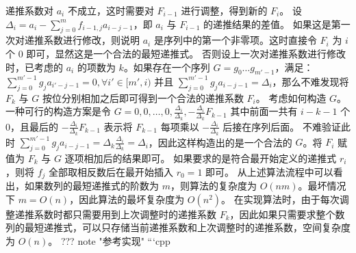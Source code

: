 递推系数对 $a_i$ 不成立，这时需要对 $F_{i - 1}$ 进行调整，得到新的 $F_i$。\markdownRendererOlItemEnd 
\markdownRendererOlEndTight \markdownRendererInterblockSeparator
{}设 $\Delta_i = a_i - \sum_{j = 0} ^ m f_{i - 1, j} a_{i - j - 1}$，即 $a_i$ 与 $F_{i - 1}$ 的递推结果的差值。\markdownRendererParagraphSeparator
{}如果这是第一次对递推系数进行修改，则说明 $a_i$ 是序列中的第一个非零项。这时直接令 $F_i$ 为 $i$ 个 $0$ 即可，显然这是一个合法的最短递推式。\markdownRendererParagraphSeparator
{}否则设上一次对递推系数进行修改时，已考虑的 ${a_i}$ 的项数为 $k$。如果存在一个序列 $G = {g_0 \dots g_{m' - 1}}$，满足：\markdownRendererParagraphSeparator
{}$\sum_{j = 0} ^ {m' - 1} g_j a_{i' - j - 1} = 0, \forall i' \in [m', i)$\markdownRendererParagraphSeparator
{}并且 $\sum_{j = 0} ^ {m' - 1} g_j a_{i - j - 1} = \Delta_i$，那么不难发现将 $F_k$ 与 $G$ 按位分别相加之后即可得到一个合法的递推系数 $F_i$。\markdownRendererParagraphSeparator
{}考虑如何构造 $G$。一种可行的构造方案是令\markdownRendererParagraphSeparator
{}$G = {0, 0, \dots, 0, \frac{\Delta_i}{\Delta_k}, -\frac{\Delta_i}{\Delta_k}F_{k-1}}$\markdownRendererParagraphSeparator
{}其中前面一共有 $i - k - 1$ 个 $0$，且最后的 $-\frac{\Delta_i}{\Delta_k} F_{k-1}$ 表示将 $F_{k-1}$ 每项乘以 $-\frac{\Delta_i}{\Delta_k}$ 后接在序列后面。\markdownRendererParagraphSeparator
{}不难验证此时 $\sum_{j = 0} ^ {m' - 1} g_j a_{i - j - 1} = \Delta_k \frac{\Delta_i}{\Delta_k} = \Delta_i$，因此这样构造出的是一个合法的 $G$。将 $F_i$ 赋值为 $F_k$ 与 $G$ 逐项相加后的结果即可。\markdownRendererParagraphSeparator
{}如果要求的是符合最开始定义的递推式 ${r_i}$，则将 ${f_j}$ 全部取相反数后在最开始插入 $r_0 = 1$ 即可。\markdownRendererParagraphSeparator
{}从上述算法流程中可以看出，如果数列的最短递推式的阶数为 $m$，则算法的复杂度为 $O(nm)$。最坏情况下 $m = O(n)$，因此算法的最坏复杂度为 $O(n^2)$。\markdownRendererParagraphSeparator
{}在实现算法时，由于每次调整递推系数时都只需要用到上次调整时的递推系数 $F_k$，因此如果只需要求整个数列的最短递推式，可以只存储当前递推系数和上次调整时的递推系数，空间复杂度为 $O(n)$。\markdownRendererParagraphSeparator
{}??? note "参考实现"\markdownRendererSoftLineBreak
{}```cpp\markdownRendererSoftLineBreak
